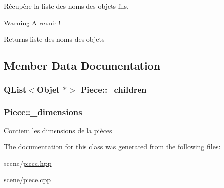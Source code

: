 Récupère la liste des noms des objets fils. 

\begin{DoxyWarning}{Warning}
A revoir ! 
\end{DoxyWarning}
\begin{DoxyReturn}{Returns}
liste des noms des objets 
\end{DoxyReturn}


\subsection{Member Data Documentation}
\hypertarget{class_piece_a3ba9c0e4bdea96982145e7ae693f5c2a}{
\subsubsection[{\+\_\+children}]{\setlength{\rightskip}{0pt plus 5cm}Q\+List$<${\bf Objet} $\ast$$>$ Piece\+::\+\_\+children\hspace{0.3cm}{\ttfamily [private]}}}\label{class_piece_a3ba9c0e4bdea96982145e7ae693f5c2a}
\hypertarget{class_piece_a47a3458694b894041bd95a1666c9bf3d}{
\subsubsection[{\+\_\+dimensions}]{ Piece\+::\+\_\+dimensions\hspace{0.3cm}{\ttfamily [private]}}}\label{class_piece_a47a3458694b894041bd95a1666c9bf3d}
Contient les dimensions de la pièces 

The documentation for this class was generated from the following files\+:\begin{DoxyCompactItemize}
\item 
scene/\hyperlink{piece_8hpp}{piece.\+hpp}\item 
scene/\hyperlink{piece_8cpp}{piece.\+cpp}\end{DoxyCompactItemize}
